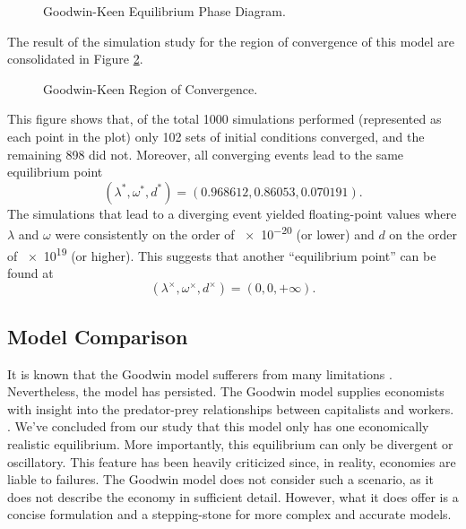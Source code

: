 \documentclass[12pt, centerh1]{article}
\begin{document}
\begin{figure}[H]
    \centering
    
    \caption{Goodwin-Keen Equilibrium Phase Diagram.}
    \label{fig:keen_phase}
\end{figure}
\noindent The result of the simulation study for the region of convergence of this model are consolidated in Figure \ref{fig:keen_study}.
\begin{figure}[H]
    \centering
    
    \caption{Goodwin-Keen Region of Convergence.}
    \label{fig:keen_study}
\end{figure}
\noindent This figure shows that, of the total 1000 simulations performed (represented as each point in the plot) only 102 sets of initial conditions converged, and the remaining 898 did not. Moreover, all converging events lead to the same equilibrium point
\begin{equation}
    (\lambda^\ast, \omega^\ast, d^\ast) = (0.968612, 0.86053, 0.070191).
\end{equation}
The simulations that lead to a diverging event yielded floating-point values where $\lambda$ and $\omega$ were consistently on the order of \num{e-20} (or lower) and $d$ on the order of \num{e19} (or higher). This suggests that another ``equilibrium point'' can be found at
\begin{equation}
    (\lambda^\times, \omega^\times, d^\times) = (0, 0, +\infty).
\end{equation}

\subsection{Model Comparison} 
It is known that the Goodwin model sufferers from many limitations \citep{harvie2000testing, moura2013testing}. Nevertheless, the model has persisted. The Goodwin model supplies economists with insight into the predator-prey relationships between capitalists and workers. \citep{goodwin1982growth}. We've concluded from our study that this model only has one economically realistic equilibrium. More importantly, this equilibrium can only be divergent or oscillatory. This feature has been heavily criticized since, in reality, economies are liable to failures. The Goodwin model does not consider such a scenario, as it does not describe the economy in sufficient detail. However, what it does offer is a concise formulation and a stepping-stone for more complex and accurate models.
\end{document}
